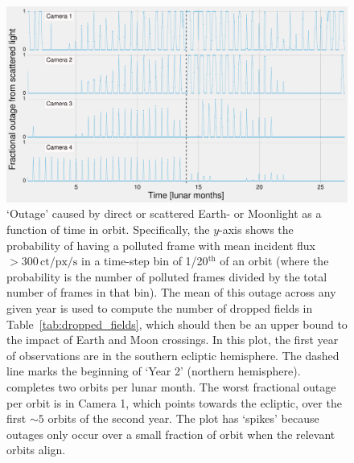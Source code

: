 \begin{figure}[!t]
	\centering
	\includegraphics[angle=90,width=1.05\textwidth]{figures/outage_earth_moon_primary_panels.pdf}
	\caption{`Outage' caused by direct or scattered Earth- or Moonlight as a 
	function of time in \tesss orbit.
	Specifically, the $y$-axis shows the probability of having a polluted frame 
	with mean incident flux $>300\,\mathrm{ct/px/s}$ in a time-step bin of 
	1/20$^\mathrm{th}$ of an 
	orbit (where the probability is the number of polluted frames divided by 
	the total number of frames in that bin).
	The mean of this outage across any given year is used to compute the number of dropped fields in Table~\protect\ref{tab:dropped_fields}, which should then be an upper bound to the impact of Earth and Moon crossings.
	In this plot, the first year of observations are in the southern ecliptic 
	hemisphere. The dashed line marks the beginning of `Year 2' (northern 
	hemisphere). 
	\tess completes two orbits per lunar month.
	The worst fractional outage per orbit is in Camera 1, which 
	points towards the ecliptic, over the first $\sim\!5$ orbits of the second 
	year.
	The plot has `spikes' because outages only occur over a small 
	fraction of \tesss orbit when the relevant orbits align.}
	\label{fig:earth_moon_primary}
\end{figure}
